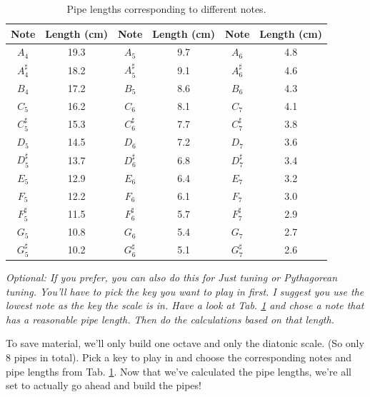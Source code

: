 \begin{table}[ht]
    \centering
    \begin{tabular}{cc|cc|cc}
        \textbf{Note} & \textbf{Length (cm)} &
        \textbf{Note} & \textbf{Length (cm)} &
        \textbf{Note} & \textbf{Length (cm)} \\ \hline
        $A_4$        & 19.3 & $A_5$        & 9.7 & $A_6$        & 4.8 \\
        $A^\sharp_4$ & 18.2 & $A^\sharp_5$ & 9.1 & $A^\sharp_6$ & 4.6 \\
        $B_4$        & 17.2 & $B_5$        & 8.6 & $B_6$        & 4.3 \\
        $C_5$        & 16.2 & $C_6$        & 8.1 & $C_7$        & 4.1 \\
        $C^\sharp_5$ & 15.3 & $C^\sharp_6$ & 7.7 & $C^\sharp_7$ & 3.8 \\
        $D_5$        & 14.5 & $D_6$        & 7.2 & $D_7$        & 3.6 \\
        $D^\sharp_5$ & 13.7 & $D^\sharp_6$ & 6.8 & $D^\sharp_7$ & 3.4 \\
        $E_5$        & 12.9 & $E_6$        & 6.4 & $E_7$        & 3.2 \\
        $F_5$        & 12.2 & $F_6$        & 6.1 & $F_7$        & 3.0 \\
        $F^\sharp_5$ & 11.5 & $F^\sharp_6$ & 5.7 & $F^\sharp_7$ & 2.9 \\
        $G_5$        & 10.8 & $G_6$        & 5.4 & $G_7$        & 2.7 \\
        $G^\sharp_5$ & 10.2 & $G^\sharp_6$ & 5.1 & $G^\sharp_7$ & 2.6 \\
    \end{tabular}
    \caption{Pipe lengths corresponding to different notes.}
    \label{tab:pipe_lengths}
\end{table}

\textit{Optional: If you prefer, you can also do this for Just tuning or Pythagorean tuning. You'll have to pick the key you want to play in first. I suggest you use the lowest note as the key the scale is in. Have a look at Tab. \ref{tab:pipe_lengths} and chose a note that has a reasonable pipe length. Then do the calculations based on that length.}

To save material, we'll only build one octave and only the diatonic scale. (So only 8 pipes in total). Pick a key to play in and choose the corresponding notes and pipe lengths from Tab. \ref{tab:pipe_lengths}.
Now that we've calculated the pipe lengths, we're all set to actually go ahead and build the pipes! 

